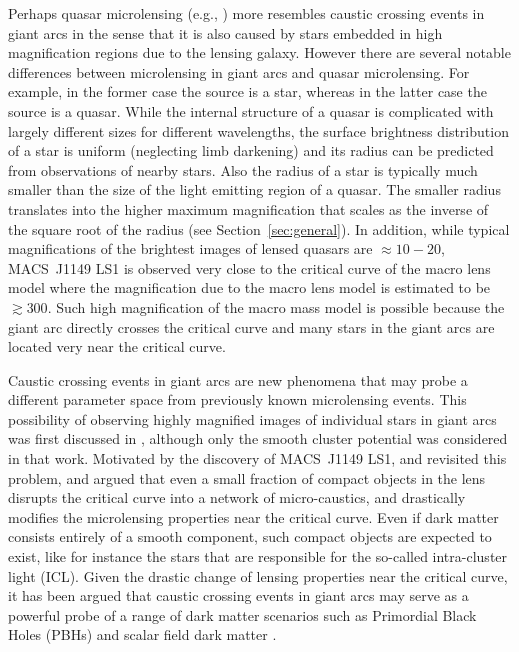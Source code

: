 \documentclass[showpacs,twocolumn,preprintnumbers,amsmath,amssymb,superscriptaddress,nofootinbib]{revtex4}
\begin{document}
Perhaps quasar microlensing (e.g.,
\cite{Wambsganss:1990aa,Schmidt:1998ah,Pooley:2006rh,Chartas:2008cg,Morgan:2010xf,Blackburne:2010ja,Jimenez-Vicente:2015eva,Mediavilla:2017bok})
more resembles caustic crossing events in giant arcs in the sense that
it is also caused by stars embedded in high magnification regions due
to the lensing galaxy. However there are several notable differences
between microlensing in giant arcs and quasar microlensing. For
example, in the former case the source is a star, whereas in the
latter case the source is a quasar. While the internal structure of a
quasar is complicated with largely different sizes for different
wavelengths, the surface brightness distribution of a star is uniform
(neglecting limb darkening) and its radius can be predicted from
observations of nearby stars. Also 
the radius of a star is typically much smaller than the size of the light
emitting region of a quasar. The smaller radius translates into the
higher maximum magnification that scales as the inverse of the square
root of the radius (see Section~\ref{sec:general}). In addition, while
typical magnifications of the brightest images of lensed quasars are
$\approx 10-20$, MACS~J1149 LS1 is observed very close to the
critical curve of the macro lens model where the magnification due to
the macro lens model is estimated to be $\gtrsim 300$. Such high
magnification of the macro mass model is possible because the giant
arc directly crosses the critical curve and many stars in the giant
arcs are located very near the critical curve.

Caustic crossing events in giant arcs are new phenomena that may probe
a different parameter space from previously known microlensing events.
This possibility of observing highly magnified images of individual
stars in giant arcs was first discussed in \cite{MiraldaEscude:1991aa}, 
although only the smooth cluster potential was considered in that
work. Motivated by the discovery of MACS~J1149 LS1,
\cite{Diego:2017drh} and \cite{Venumadhav:2017pps} revisited this
problem, and argued that even a small fraction of compact objects in
the lens disrupts the critical curve into a network of micro-caustics,
and drastically modifies the microlensing properties near the critical
curve. Even if dark matter consists entirely of a smooth component,
such compact objects are expected to exist, like for instance the
stars that are responsible for the so-called intra-cluster light
(ICL). Given the drastic change of 
lensing properties near the critical curve, it has been argued that
caustic crossing events in giant arcs may serve as a powerful probe of
a range of dark matter scenarios such as Primordial Black Holes (PBHs)
\cite{Bird:2016dcv,Sasaki:2016jop,Kawasaki:2016pql,Carr:2016drx,Inomata:2017okj}
and scalar field dark matter \cite{Hu:2000ke,Schive:2014dra,Hui:2016ltb}. 
\end{document}

